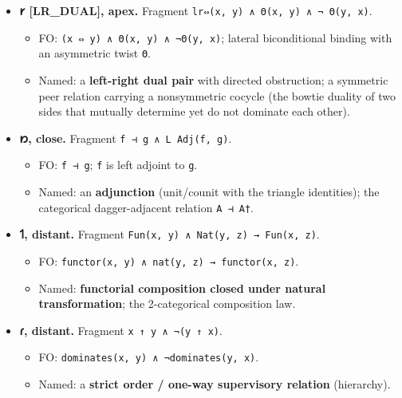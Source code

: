 \documentclass[12pt,a4paper]{article}
\begin{document}
\begin{itemize}
\tightlist
\item
  \textbf{𐑾 {[}LR\_DUAL{]}, apex.} Fragment
  \texttt{lr⇔(x,\ y)\ ∧\ Θ(x,\ y)\ ∧\ ¬\ Θ(y,\ x)}.

  \begin{itemize}
  \tightlist
  \item
    FO: \texttt{(x\ ⇔\ y)\ ∧\ Θ(x,\ y)\ ∧\ ¬Θ(y,\ x)}; lateral
    biconditional binding with an asymmetric twist \texttt{Θ}.
  \item
    Named: a \textbf{left-right dual pair} with directed obstruction; a
    symmetric peer relation carrying a nonsymmetric cocycle (the bowtie
    duality of two sides that mutually determine yet do not dominate
    each other).
  \end{itemize}
\item
  \textbf{𐑽, close.} Fragment \texttt{f\ ⊣\ g\ ∧\ L\ Adj(f,\ g)}.

  \begin{itemize}
  \tightlist
  \item
    FO: \texttt{f\ ⊣\ g}; \texttt{f} is left adjoint to \texttt{g}.
  \item
    Named: an \textbf{adjunction} (unit/counit with the triangle
    identities); the categorical dagger-adjacent relation
    \texttt{A\ ⊣\ A†}.
  \end{itemize}
\item
  \textbf{𐑑, distant.} Fragment
  \texttt{Fun(x,\ y)\ ∧\ Nat(y,\ z)\ →\ Fun(x,\ z)}.

  \begin{itemize}
  \tightlist
  \item
    FO: \texttt{functor(x,\ y)\ ∧\ nat(y,\ z)\ →\ functor(x,\ z)}.
  \item
    Named: \textbf{functorial composition closed under natural
    transformation}; the 2-categorical composition law.
  \end{itemize}
\item
  \textbf{𐑩, distant.} Fragment \texttt{x\ ↑\ y\ ∧\ ¬(y\ ↑\ x)}.

  \begin{itemize}
  \tightlist
  \item
    FO: \texttt{dominates(x,\ y)\ ∧\ ¬dominates(y,\ x)}.
  \item
    Named: a \textbf{strict order / one-way supervisory relation}
    (hierarchy).
  \end{itemize}
\end{itemize}
\end{document}

